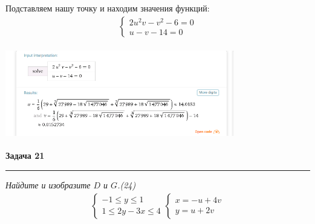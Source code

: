 \documentclass[a4paper,11pt]{article}
\begin{document}
Подставляем нашу точку и находим значения функций:
\begin{gather*}
\begin{cases}
2u^2v - v^2 - 6 = 0 \\[2pt]
u - v - 14 = 0
\end{cases}
\end{gather*}
\begin{center}
	\includegraphics[width = 100mm, height=40mm]{images/6.png}
\end{center}
\newpage 




\textbf{\large Задача 21}
	\medskip\hrule\medskip
	\textit{Найдите и изобразите $ D $ и $ G $.(24)}
	\begin{gather*}
	\begin{cases}
	-1 \leqslant y \leqslant 1 \\[2pt]
	1 \leqslant 2y - 3x \leqslant 4 
	\end{cases}
	\begin{cases}
	x = -u + 4v \\[2pt]
	y = u + 2v
	\end{cases}
	\end{gather*}
	
\end{document}
